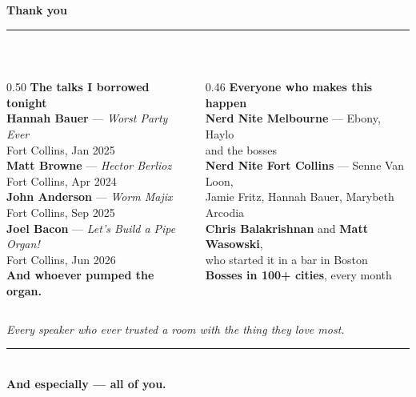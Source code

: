 \begin{frame}[plain]
  \vspace*{3mm}\centering
  {\color{NNLblue}\normalsize\bfseries Thank you}\\[1.5mm]
  {\color{NNLblue}\rule{0.86\textwidth}{1.2pt}}\\[3mm]
  \begin{columns}[T,onlytextwidth]
    \begin{column}{0.50\textwidth}
      {\color{NNorange}\footnotesize\bfseries The talks I borrowed tonight}\\[2mm]
      {\scriptsize\color{white}
       \textbf{Hannah Bauer} --- \textit{Worst Party Ever}\\
       {\color{NNpink}Fort Collins, Jan 2025}\\[1.5mm]
       \textbf{Matt Browne} --- \textit{Hector Berlioz}\\
       {\color{NNpink}Fort Collins, Apr 2024}\\[1.5mm]
       \textbf{John Anderson} --- \textit{Worm Majix}\\
       {\color{NNpink}Fort Collins, Sep 2025}\\[1.5mm]
       \textbf{Joel Bacon} --- \textit{Let's Build a Pipe Organ!}\\
       {\color{NNpink}Fort Collins, Jun 2026}\\[2mm]
       {\color{NNLblue}\bfseries And whoever pumped the organ.}}
    \end{column}
    \begin{column}{0.46\textwidth}
      {\color{NNorange}\footnotesize\bfseries Everyone who makes this happen}\\[2mm]
      {\scriptsize\color{white}
       \textbf{Nerd Nite Melbourne} --- Ebony, Haylo\\ and the bosses\\[1.5mm]
       \textbf{Nerd Nite Fort Collins} --- Senne Van Loon,\\
       Jamie Fritz, Hannah Bauer, Marybeth Arcodia\\[1.5mm]
       \textbf{Chris Balakrishnan} and \textbf{Matt Wasowski},\\
       who started it in a bar in Boston\\[1.5mm]
       \textbf{Bosses in 100+ cities}, every month}
    \end{column}
  \end{columns}
  \vspace{3mm}\par
  {\scriptsize\itshape\color{NNpink}Every speaker who ever trusted a room with the thing they love most.}\\[2.5mm]
  {\color{NNLblue}\rule{0.86\textwidth}{0.8pt}}\\[2.5mm]
  {\normalsize\color{NNorange}\bfseries And especially --- all of you.}
\end{frame}


